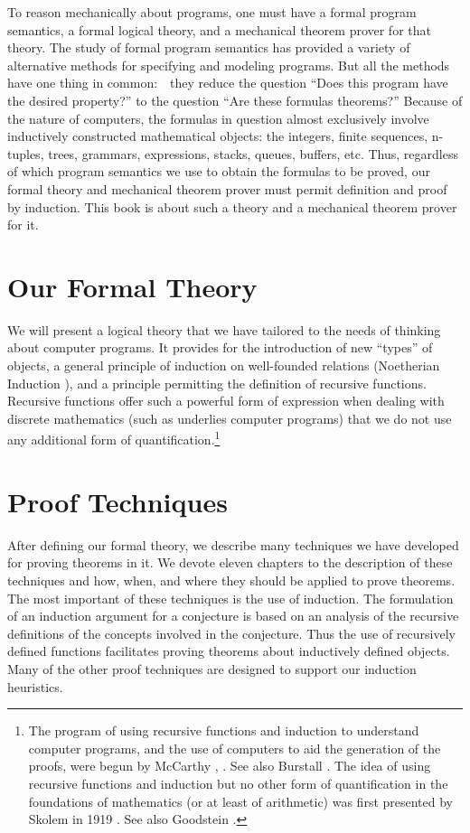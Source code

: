 \documentclass[10pt]{book}
\begin{document}
To reason mechanically about programs, one must have a formal program
semantics, a formal logical theory, and a mechanical theorem prover for that
theory.
The study of formal program semantics
has provided a variety of alternative methods for specifying and
modeling programs.  But all the methods have one thing in common:~~they
reduce the question ``Does this program have the desired property?''
to the question ``Are these formulas theorems?''  Because of the
nature of computers, the formulas in question almost
exclusively involve inductively constructed mathematical objects:  the integers,
finite sequences, n-tuples, trees, grammars, expressions, stacks, queues, buffers,
etc.  Thus, regardless of which program semantics
we use to obtain the formulas to be proved, our formal theory and
mechanical theorem prover must permit
definition and proof by induction.
This book is
about such a theory and a mechanical theorem prover for it.

\section{Our Formal Theory}
We will present  a logical theory that we have tailored
to the needs of thinking about computer programs.
It provides for the  introduction of new
``types'' of objects, a general principle of induction on well-founded
relations (Noetherian Induction \cite{BOURBAKI}), and a 
principle permitting the definition of recursive
functions.
Recursive functions offer such a powerful form
of expression when dealing with discrete mathematics (such as  underlies
computer programs) that we do not use any additional
form of quantification.\footnote{The program of using recursive functions and induction to understand computer programs, and the use of computers to aid the generation of the proofs, were begun by McCarthy \cite{MCCARTHYCHECKING}, \cite{MCCARTHYBASIS}. See also Burstall \cite{BURSTALL}. The idea of using recursive functions and induction but no other form of quantification in the foundations of mathematics (or at least of arithmetic) was first presented by Skolem in 1919 \cite{SKOLEM}.  See also Goodstein \cite{GOODSTEIN}.}

\section{Proof Techniques}
After defining our formal theory, we describe
many techniques we have developed for proving theorems
in it.  We devote eleven chapters to the description of these
techniques and how, when, and where they should be applied to prove theorems.
The most important of these techniques is the use of induction.  The formulation
of an induction argument for a conjecture is based on an analysis of the
recursive definitions of the concepts involved in the conjecture.  Thus the
use of recursively defined functions facilitates proving theorems
about inductively defined objects.  Many of the other proof techniques
are designed to support our induction heuristics.
\end{document}
